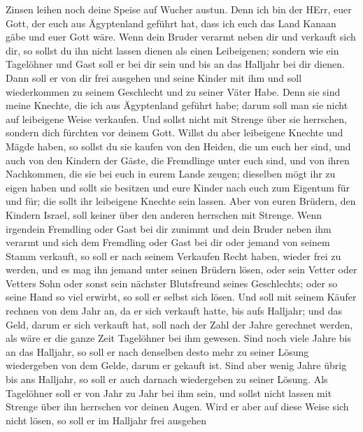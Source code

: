 Zinsen leihen noch deine Speise auf Wucher austun.  Denn
ich bin der HErr, euer Gott, der euch aus Ägyptenland geführt hat, dass
ich euch das Land Kanaan gäbe und euer Gott wäre.  Wenn
dein Bruder verarmt neben dir und verkauft sich dir, so sollst du ihn
nicht lassen dienen als einen Leibeigenen;  sondern wie ein
Tagelöhner und Gast soll er bei dir sein und bis an das Halljahr bei dir
dienen.  Dann soll er von dir frei ausgehen und seine
Kinder mit ihm und soll wiederkommen zu seinem Geschlecht und zu seiner
Väter Habe.  Denn sie sind meine Knechte, die ich aus
Ägyptenland geführt habe; darum soll man sie nicht auf leibeigene Weise
verkaufen.  Und sollst nicht mit Strenge über sie
herrschen, sondern dich fürchten vor deinem Gott.  Willst
du aber leibeigene Knechte und Mägde haben, so sollst du sie kaufen von
den Heiden, die um euch her sind,  und auch von den Kindern
der Gäste, die Fremdlinge unter euch sind, und von ihren Nachkommen, die
sie bei euch in eurem Lande zeugen; dieselben mögt ihr zu eigen haben
 und sollt sie besitzen und eure Kinder nach euch zum
Eigentum für und für; die sollt ihr leibeigene Knechte sein lassen. Aber
von euren Brüdern, den Kindern Israel, soll keiner über den anderen
herrschen mit Strenge.  Wenn irgendein Fremdling oder Gast
bei dir zunimmt und dein Bruder neben ihm verarmt und sich dem Fremdling
oder Gast bei dir oder jemand von seinem Stamm verkauft, 
so soll er nach seinem Verkaufen Recht haben, wieder frei zu werden, und
es mag ihn jemand unter seinen Brüdern lösen,  oder sein
Vetter oder Vetters Sohn oder sonst sein nächster Blutsfreund seines
Geschlechts; oder so seine Hand so viel erwirbt, so soll er selbst sich
lösen.  Und soll mit seinem Käufer rechnen von dem Jahr an,
da er sich verkauft hatte, bis aufs Halljahr; und das Geld, darum er
sich verkauft hat, soll nach der Zahl der Jahre gerechnet werden, als
wäre er die ganze Zeit Tagelöhner bei ihm gewesen.  Sind
noch viele Jahre bis an das Halljahr, so soll er nach denselben desto
mehr zu seiner Lösung wiedergeben von dem Gelde, darum er gekauft ist.
 Sind aber wenig Jahre übrig bis ans Halljahr, so soll er
auch darnach wiedergeben zu seiner Lösung.  Als Tagelöhner
soll er von Jahr zu Jahr bei ihm sein, und sollst nicht lassen mit
Strenge über ihn herrschen vor deinen Augen.  Wird er aber
auf diese Weise sich nicht lösen, so soll er im Halljahr frei ausgehen
